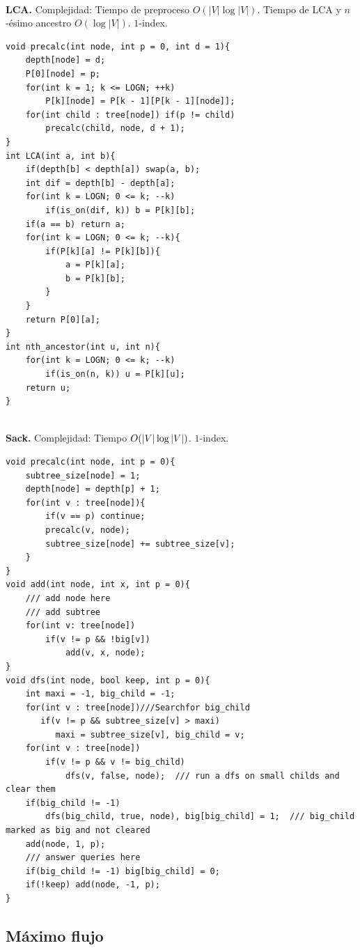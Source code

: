 \documentclass[10pt,spanish,mexico]{article}
\numberwithin{equation}{section}
\begin{document}
\begin{multicols}{2}
\vspace{-1.2\baselineskip}
\hrulefill\\
\textbf{LCA.} Complejidad: Tiempo de preproceso $O(|V|\log |V|)$. Tiempo de LCA y $n$-ésimo ancestro $O(\log |V|)$. $1$-index.
\begin{verbatim}
void precalc(int node, int p = 0, int d = 1){
    depth[node] = d;
    P[0][node] = p;
    for(int k = 1; k <= LOGN; ++k)
        P[k][node] = P[k - 1][P[k - 1][node]];
    for(int child : tree[node]) if(p != child)
        precalc(child, node, d + 1);
}
int LCA(int a, int b){
    if(depth[b] < depth[a]) swap(a, b);
    int dif = depth[b] - depth[a];
    for(int k = LOGN; 0 <= k; --k)
        if(is_on(dif, k)) b = P[k][b];
    if(a == b) return a;
    for(int k = LOGN; 0 <= k; --k){
        if(P[k][a] != P[k][b]){
            a = P[k][a];
            b = P[k][b];
        }
    }
    return P[0][a];
}
int nth_ancestor(int u, int n){
    for(int k = LOGN; 0 <= k; --k)
        if(is_on(n, k)) u = P[k][u];
    return u;
}
\end{verbatim}

\vspace{-1.2\baselineskip}
\hrulefill\\
\textbf{Sack.} Complejidad: Tiempo $O(\abs{V}\log \abs{V})$. $1$-index.
\begin{verbatim}
void precalc(int node, int p = 0){
    subtree_size[node] = 1;
    depth[node] = depth[p] + 1;
    for(int v : tree[node]){
        if(v == p) continue;
        precalc(v, node);
        subtree_size[node] += subtree_size[v];
    }
}
void add(int node, int x, int p = 0){
    /// add node here
    /// add subtree
    for(int v: tree[node])
        if(v != p && !big[v])
            add(v, x, node);
}
void dfs(int node, bool keep, int p = 0){
    int maxi = -1, big_child = -1;
    for(int v : tree[node])///Searchfor big_child
       if(v != p && subtree_size[v] > maxi)
          maxi = subtree_size[v], big_child = v;
    for(int v : tree[node])
        if(v != p && v != big_child)
            dfs(v, false, node);  /// run a dfs on small childs and clear them
    if(big_child != -1)
        dfs(big_child, true, node), big[big_child] = 1;  /// big_child marked as big and not cleared
    add(node, 1, p);
    /// answer queries here
    if(big_child != -1) big[big_child] = 0;
    if(!keep) add(node, -1, p);
}
\end{verbatim}

\vspace{-1.2\baselineskip}
\hrulefill
\subsection{Máximo flujo}


\end{multicols}
\end{document}
